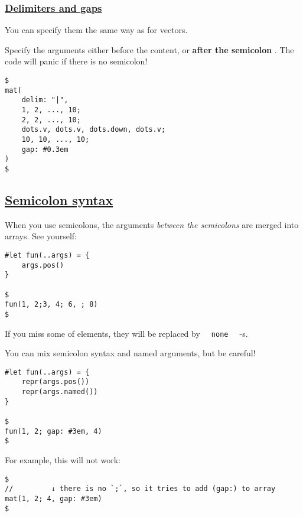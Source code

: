 \pandocbounded{}

\subsubsection{\texorpdfstring{\hyperref[delimiters-and-gaps]{Delimiters
and gaps}}{Delimiters and gaps}}\label{delimiters-and-gaps}

You can specify them the same way as for vectors.

Specify the arguments either before the content, or \textbf{after the
semicolon} . The code will panic if there is no semicolon!

\begin{verbatim}
$
mat(
    delim: "|",
    1, 2, ..., 10;
    2, 2, ..., 10;
    dots.v, dots.v, dots.down, dots.v;
    10, 10, ..., 10;
    gap: #0.3em
)
$
\end{verbatim}

\pandocbounded{}

\subsection{\texorpdfstring{\hyperref[semicolon-syntax]{Semicolon
syntax}}{Semicolon syntax}}\label{semicolon-syntax}

When you use semicolons, the arguments \emph{between the semicolons} are
merged into arrays. See yourself:

\begin{verbatim}
#let fun(..args) = {
    args.pos()
}

$
fun(1, 2;3, 4; 6, ; 8)
$
\end{verbatim}

\pandocbounded{}

If you miss some of elements, they will be replaced by
\texttt{\ }{\texttt{\ none\ }}\texttt{\ } -s.

You can mix semicolon syntax and named arguments, but be careful!

\begin{verbatim}
#let fun(..args) = {
    repr(args.pos())
    repr(args.named())
}

$
fun(1, 2; gap: #3em, 4)
$
\end{verbatim}

\pandocbounded{}

For example, this will not work:

\begin{verbatim}
$
//         ↓ there is no `;`, so it tries to add (gap:) to array
mat(1, 2; 4, gap: #3em)
$
\end{verbatim}
